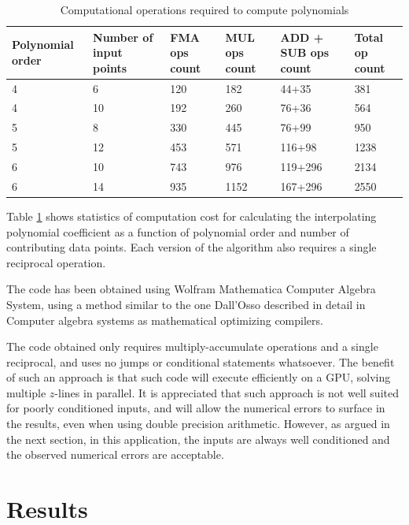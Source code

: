 \begin{table}[htbp!]
\begin{center}
	\begin{tabular}{| p{2.4cm} | p{2cm} | p{1.8cm} | p{1.8cm} | p{2cm} | p{1.6cm} |}
	\hline 
	\textbf{Polynomial order} & \textbf{Number of input points} & \textbf{FMA ops count} & \textbf{MUL ops count} & \textbf{ADD + SUB ops count} & \textbf{Total op count} \\ \hline \hline 
	4	& 6 & 120 & 182 & 44+35 & 381 \\ \hline
	4	& 10 & 192 & 260 & 76+36 & 564 \\ \hline
	5	& 8 & 330 & 445 & 76+99 & 950 \\ \hline
	5	& 12 & 453 & 571 & 116+98 & 1238 \\ \hline
	6	& 10 & 743 & 976 & 119+296 & 2134 \\ \hline
	6	& 14 & 935 & 1152 & 167+296 & 2550 \\ \hline
	\end{tabular}
	\caption{Computational operations required to compute polynomials}
	\label{table:cuetfm_poly_operations}
	\end{center}
	\end{table}

Table \ref{table:cuetfm_poly_operations} shows statistics of computation cost for calculating the interpolating polynomial coefficient as a function of polynomial order and number of contributing data points. Each version of the algorithm also requires a single reciprocal operation.

The code has been obtained using Wolfram Mathematica Computer Algebra System, using a method similar to the one Dall'Osso described in detail in Computer algebra systems as mathematical optimizing compilers\cite{dallosso_computer_2006}. 

The code obtained only requires multiply-accumulate operations and a single reciprocal, and uses no jumps or conditional statements whatsoever. The benefit of such an approach is that such code will execute efficiently on a GPU, solving multiple $z$-lines in parallel. It is appreciated that such approach is not well suited for poorly conditioned inputs, and will allow the numerical errors to surface in the results, even when using double precision arithmetic. However, as argued in the next section, in this application, the inputs are always well conditioned and the observed numerical errors are acceptable. 

\section{Results}

